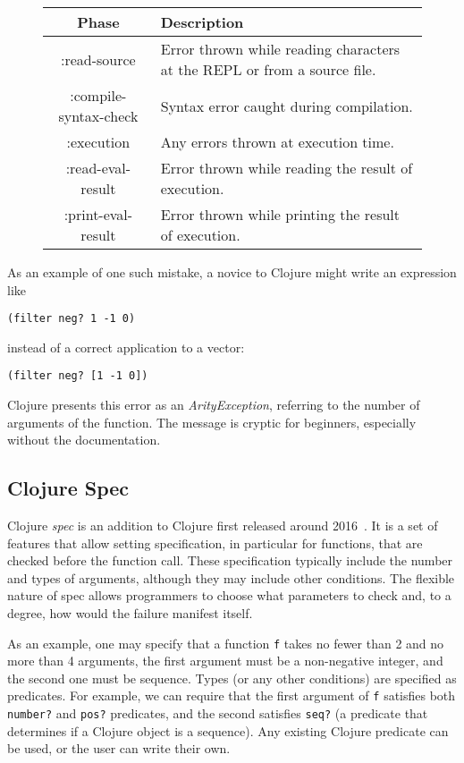 \documentclass[12pt]{article}
\newcommand{\comment}[1]{{\bf \tt  {#1}}}
\newcommand{\emcomment}[1]{\textcolor{ForestGreen}{\comment{Elena: {#1}}}}
\begin{document}
	\begin{figure}[h]
		\centering
		\begin{tabular}{|c|l|}
			\hline
			\textbf{Phase} & \textbf{Description} \\
			\hline
			:read-source & Error thrown while reading characters at the REPL or from a source file. \\
			:compile-syntax-check & Syntax error caught during compilation. \\
			:execution & Any errors thrown at execution time. \\
			:read-eval-result & Error thrown while reading the result of execution. \\
			:print-eval-result & Error thrown while printing the result of execution. \\
			\hline
		\end{tabular}
	\end{figure}
	

As an example of one such mistake, a novice to Clojure might write an expression like
\begin{verbatim}
(filter neg? 1 -1 0)
\end{verbatim}
instead of a correct application to a vector:
\begin{verbatim}
(filter neg? [1 -1 0])
\end{verbatim}
 Clojure presents this error as an {\it ArityException}, referring to the number of arguments of the function. 
 The message is cryptic for beginners, especially without the documentation.

\subsection{Clojure Spec}\label{subsec:spec}
Clojure \textit{spec} is an addition to Clojure first released around 2016~\cite{spec-overview}.
It is a set of features that allow setting specification, in particular for functions, that are checked before the function call. 
These specification typically include the number and types of arguments, although they may include other conditions.
The flexible nature of spec allows programmers to choose what parameters to check and, to a degree, how would the failure manifest itself. 

As an example, one may specify that a function \texttt{f} takes no fewer than 2 and no more than 4 arguments, the first argument must be a non-negative integer, and the second one must be sequence. 
Types (or any other conditions) are specified as predicates. 
For example, we can require that the first argument of \texttt{f} satisfies both \texttt{number?} and \texttt{pos?} predicates, and the second satisfies \texttt{seq?} (a predicate that determines if a Clojure object is a sequence).
Any existing Clojure predicate can be used, or the user can write their own. 
\end{document}
